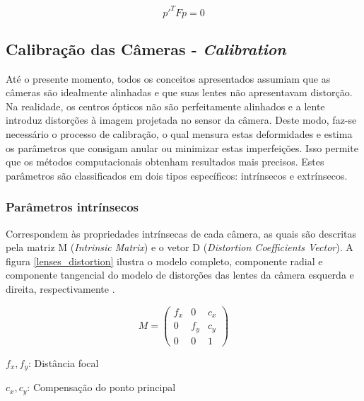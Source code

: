\begin{equation}
 \label{epipolar_constraint}
 p'^TFp = 0
\end{equation}


\subsection{Calibração das Câmeras - \textit{Calibration}}
\label{theory_calib}

Até o presente momento, todos os conceitos apresentados assumiam que as câmeras são idealmente alinhadas e que suas lentes não apresentavam distorção. Na realidade, os centros ópticos não são perfeitamente alinhados e a lente introduz distorções à imagem projetada no sensor da câmera. Deste modo, faz-se necessário o processo de calibração, o qual mensura estas deformidades e estima os parâmetros que consigam anular ou minimizar estas imperfeições. Isso permite que os métodos computacionais obtenham resultados mais precisos. Estes parâmetros são classificados em dois tipos específicos: intrínsecos e extrínsecos.


\subsubsection{Parâmetros intrínsecos}

Correspondem às propriedades intrínsecas de cada câmera, as quais são descritas pela matriz M (\textit{Intrinsic Matrix}) e o vetor D (\textit{Distortion Coefficients Vector}). A figura \ref{lenses_distortion} ilustra o modelo completo, componente radial e componente tangencial do modelo de distorções das lentes da câmera esquerda e direita, respectivamente \cite{OpenCVCalibrationModule}.

\begin{equation}
 M = \begin{pmatrix}
f_x & 0   & c_x\\ 
  0 & f_y & c_y\\ 
  0 & 0   & 1
\end{pmatrix}
\end{equation}

\begin{center}
  $f_x,f_y$: Distância focal
  
  $c_x,c_y$: Compensação do ponto principal
\end{center}

